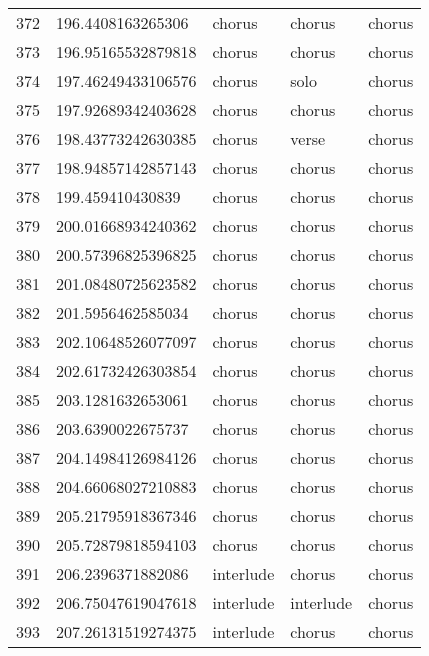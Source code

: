 \begin{table}[]
\begin{tabular}{lllll}
    372  & 196.4408163265306  & chorus       & chorus          & chorus         \\
    373  & 196.95165532879818 & chorus       & chorus          & chorus         \\
    374  & 197.46249433106576 & chorus       & solo            & chorus         \\
    375  & 197.92689342403628 & chorus       & chorus          & chorus         \\
    376  & 198.43773242630385 & chorus       & verse           & chorus         \\
    377  & 198.94857142857143 & chorus       & chorus          & chorus         \\
    378  & 199.459410430839   & chorus       & chorus          & chorus         \\
    379  & 200.01668934240362 & chorus       & chorus          & chorus         \\
    380  & 200.57396825396825 & chorus       & chorus          & chorus         \\
    381  & 201.08480725623582 & chorus       & chorus          & chorus         \\
    382  & 201.5956462585034  & chorus       & chorus          & chorus         \\
    383  & 202.10648526077097 & chorus       & chorus          & chorus         \\
    384  & 202.61732426303854 & chorus       & chorus          & chorus         \\
    385  & 203.1281632653061  & chorus       & chorus          & chorus         \\
    386  & 203.6390022675737  & chorus       & chorus          & chorus         \\
    387  & 204.14984126984126 & chorus       & chorus          & chorus         \\
    388  & 204.66068027210883 & chorus       & chorus          & chorus         \\
    389  & 205.21795918367346 & chorus       & chorus          & chorus         \\
    390  & 205.72879818594103 & chorus       & chorus          & chorus         \\
    391  & 206.2396371882086  & interlude    & chorus          & chorus         \\
    392  & 206.75047619047618 & interlude    & interlude       & chorus         \\
    393  & 207.26131519274375 & interlude    & chorus          & chorus         \\

\end{tabular}
\end{table}
